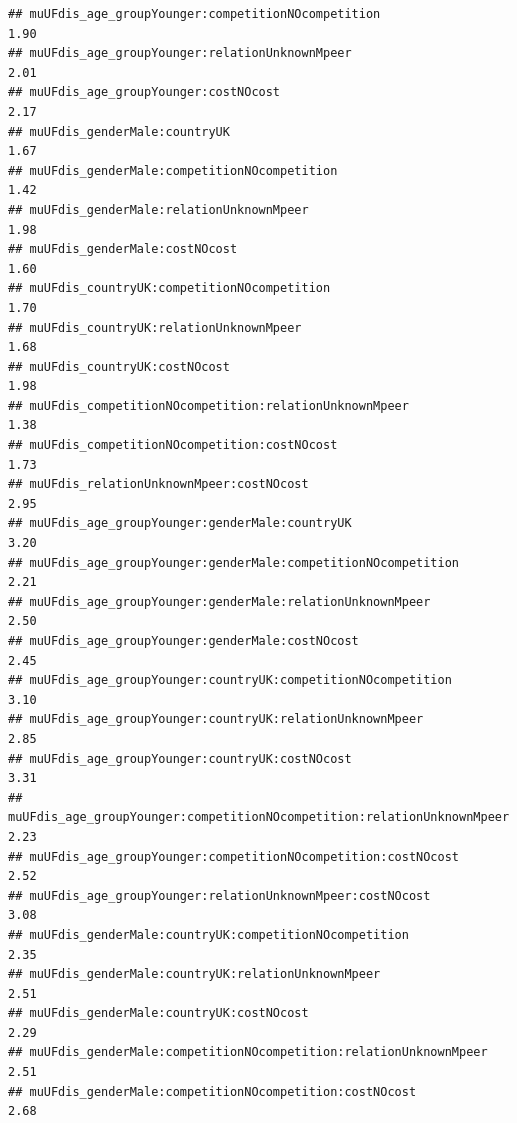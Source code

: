 \documentclass[
]{article}
\begin{document}
\begin{verbatim}
## muUFdis_age_groupYounger:competitionNOcompetition                                      1.90
## muUFdis_age_groupYounger:relationUnknownMpeer                                          2.01
## muUFdis_age_groupYounger:costNOcost                                                    2.17
## muUFdis_genderMale:countryUK                                                           1.67
## muUFdis_genderMale:competitionNOcompetition                                            1.42
## muUFdis_genderMale:relationUnknownMpeer                                                1.98
## muUFdis_genderMale:costNOcost                                                          1.60
## muUFdis_countryUK:competitionNOcompetition                                             1.70
## muUFdis_countryUK:relationUnknownMpeer                                                 1.68
## muUFdis_countryUK:costNOcost                                                           1.98
## muUFdis_competitionNOcompetition:relationUnknownMpeer                                  1.38
## muUFdis_competitionNOcompetition:costNOcost                                            1.73
## muUFdis_relationUnknownMpeer:costNOcost                                                2.95
## muUFdis_age_groupYounger:genderMale:countryUK                                          3.20
## muUFdis_age_groupYounger:genderMale:competitionNOcompetition                           2.21
## muUFdis_age_groupYounger:genderMale:relationUnknownMpeer                               2.50
## muUFdis_age_groupYounger:genderMale:costNOcost                                         2.45
## muUFdis_age_groupYounger:countryUK:competitionNOcompetition                            3.10
## muUFdis_age_groupYounger:countryUK:relationUnknownMpeer                                2.85
## muUFdis_age_groupYounger:countryUK:costNOcost                                          3.31
## muUFdis_age_groupYounger:competitionNOcompetition:relationUnknownMpeer                 2.23
## muUFdis_age_groupYounger:competitionNOcompetition:costNOcost                           2.52
## muUFdis_age_groupYounger:relationUnknownMpeer:costNOcost                               3.08
## muUFdis_genderMale:countryUK:competitionNOcompetition                                  2.35
## muUFdis_genderMale:countryUK:relationUnknownMpeer                                      2.51
## muUFdis_genderMale:countryUK:costNOcost                                                2.29
## muUFdis_genderMale:competitionNOcompetition:relationUnknownMpeer                       2.51
## muUFdis_genderMale:competitionNOcompetition:costNOcost                                 2.68

\end{verbatim}
\end{document}
